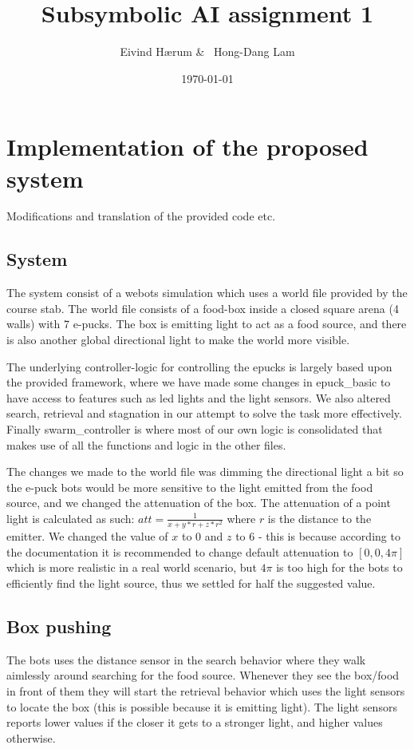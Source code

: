 \documentclass[12pt, a4paper]{article}
\title{Subsymbolic AI assignment 1}
\author{Eivind Hærum \& \ Hong-Dang Lam}
\date{\today} %
\begin{document}
\maketitle
% 
% 
\newpage

\tableofcontents
{}
\newpage

\section{Implementation of the proposed system}
Modifications and translation of the provided code etc.

\subsection{System}
The system consist of a webots simulation which uses a world file provided by the course stab. The world file consists of a food-box inside a closed square arena (4 walls) with 7 e-pucks. The box is emitting light to act as a food source, and there is also another global directional light to make the world more visible.


The underlying controller-logic for controlling the epucks is largely based upon the provided framework, where we have made some changes in epuck\_basic to have access to features such as led lights and the light sensors. We also altered search, retrieval and stagnation in our attempt to solve the task more effectively. Finally swarm\_controller is where most of our own logic is consolidated that makes use of all the functions and logic in the other files. 

The changes we made to the world file was dimming the directional light a bit so the e-puck bots would be more sensitive to the light emitted from the food source, and we changed the attenuation of the box. The attenuation of a point light is calculated as such: $ att = \frac{1}{x+y*r+z*r^2} $ where $r$ is the distance to the emitter. We changed the value of $x$ to 0 and $z$ to 6 - this is because according to the documentation it is recommended to change default attenuation to $[0,0,4\pi]$ which is more realistic in a real world scenario, but $4\pi$ is too high for the bots to efficiently find the light source, thus we settled for half the suggested value.  
\subsection{Box pushing}
The bots uses the distance sensor in the search behavior where they walk aimlessly around searching for the food source. Whenever they see the box/food in front of them they will start the retrieval behavior which uses the light sensors to locate the box (this is possible because it is emitting light). The light sensors reports lower values if the closer it gets to a stronger light, and higher values otherwise.
\end{document}
